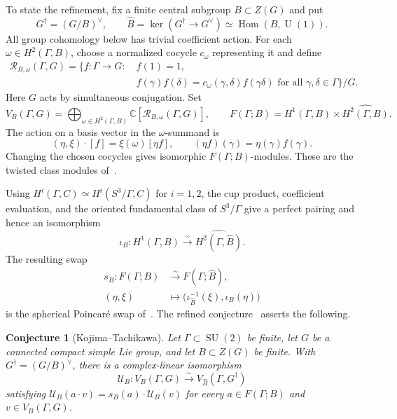 \documentclass[11pt,a4paper,reqno]{amsart}
\theoremstyle{plain}
\newtheorem{conjecture}[theorem]{Conjecture}
\theoremstyle{definition}
\theoremstyle{remark}
\numberwithin{equation}{section}
\DeclareMathOperator{\Hom}{Hom}
\newcommand{\SU}{\operatorname{SU}}
\newcommand{\UU}{\operatorname{U}}
\newcommand{\CC}{\mathbb C}
\begin{document}
To state the refinement, fix a finite central subgroup $B\subset Z(G)$ and put
\[
G^\dagger=(G/B)^\vee,\qquad \widehat B=\ker(G^\dagger\to G^\vee)\simeq\Hom(B,\UU(1)).
\]
All group cohomology below has trivial coefficient action. For each $\omega\in H^2(\Gamma,B)$, choose a normalized cocycle $c_\omega$ representing it and define
\[
\begin{split} \mathscr R_{B,\omega}(\Gamma,G)= \bigl\{f\colon\Gamma\to G:\ &f(1)=1,\\ &f(\gamma)f(\delta)=c_\omega(\gamma,\delta)f(\gamma\delta) \text{ for all }\gamma,\delta\in\Gamma\bigr\}/G. \end{split}
\]
Here $G$ acts by simultaneous conjugation. Set
\[
V_B(\Gamma,G)=\bigoplus_{\omega\in H^2(\Gamma,B)} \CC[\mathscr R_{B,\omega}(\Gamma,G)], \qquad F(\Gamma;B)=H^1(\Gamma,B)\times\widehat{H^2(\Gamma,B)}.
\]
The action on a basis vector in the $\omega$-summand is
\[
(\eta,\xi)\cdot[f]=\xi(\omega)[\eta f], \qquad (\eta f)(\gamma)=\eta(\gamma)f(\gamma).
\]
Changing the chosen cocycles gives isomorphic $F(\Gamma;B)$-modules. These are the twisted class modules of~\cite[Definitions~1.5 and~1.7]{kojima-tachikawa}.

Using $H^i(\Gamma,C)\simeq H^i(S^3/\Gamma,C)$ for $i=1,2$, the cup product, coefficient evaluation, and the oriented fundamental class of $S^3/\Gamma$ give a perfect pairing and hence an isomorphism
\[
\iota_B\colon H^1(\Gamma,B)\xrightarrow{\sim} \widehat{H^2(\Gamma,\widehat B)}.
\]
The resulting swap
\[
\begin{split} s_B\colon F(\Gamma;B)&\xrightarrow{\sim}F(\Gamma;\widehat B),\\ (\eta,\xi)&\longmapsto \bigl(\iota_{\widehat B}^{-1}(\xi),\iota_B(\eta)\bigr) \end{split}
\]
is the spherical Poincar\'e swap of~\cite[Definition~1.8]{kojima-tachikawa}. The refined conjecture~\cite[Conjecture~1.9]{kojima-tachikawa} asserts the following.

\begin{conjecture}[Kojima--Tachikawa]\label{Conj.fou}
Let $\Gamma\subset\SU(2)$ be finite, let $G$ be a connected compact simple Lie group, and let $B\subset Z(G)$ be finite. With $G^\dagger=(G/B)^\vee$, there is a complex-linear isomorphism
\[
\mathcal U_B\colon V_B(\Gamma,G)\xrightarrow{\sim} V_{\widehat B}(\Gamma,G^\dagger)
\]
satisfying $\mathcal U_B(a\cdot v)=s_B(a)\cdot\mathcal U_B(v)$ for every $a\in F(\Gamma;B)$ and $v\in V_B(\Gamma,G)$.
\end{conjecture}
\end{document}
